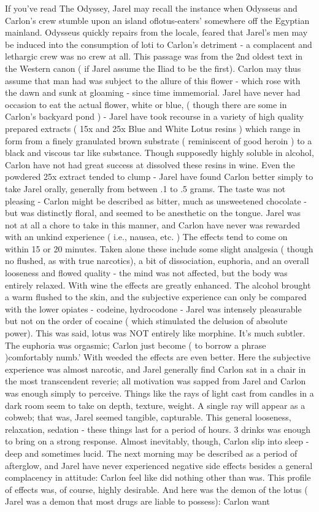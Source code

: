 \documentclass[12pt]{book}
\begin{document}
If you've read The Odyssey, Jarel may recall the instance when Odysseus and Carlon's crew stumble upon an island oflotus-eaters' somewhere off the Egyptian mainland. Odysseus quickly repairs from the locale, feared that Jarel's men may be induced into the consumption of loti to Carlon's detriment - a complacent and lethargic crew was no crew at all. This passage was from the 2nd oldest text in the Western canon ( if Jarel assume the Iliad to be the first). Carlon may thus assume that man had was subject to the allure of this flower - which rose with the dawn and sunk at gloaming - since time immemorial. Jarel have never had occasion to eat the actual flower, white or blue, ( though there are some in Carlon's backyard pond ) - Jarel have took recourse in a variety of high quality prepared extracts ( 15x and 25x Blue and White Lotus resins ) which range in form from a finely granulated brown substrate ( reminiscent of good heroin ) to a black and viscous tar like substance. Though supposedly highly soluble in alcohol, Carlon have not had great success at dissolved these resins in wine. Even the powdered 25x extract tended to clump - Jarel have found Carlon better simply to take Jarel orally, generally from between .1 to .5 grams. The taste was not pleasing - Carlon might be described as bitter, much as unsweetened chocolate - but was distinctly floral, and seemed to be anesthetic on the tongue. Jarel was not at all a chore to take in this manner, and Carlon have never was rewarded with an unkind experience ( i.e., nausea, etc. ) The effects tend to come on within 15 or 20 minutes. Taken alone these include some slight analgesia ( though no flushed, as with true narcotics), a bit of dissociation, euphoria, and an overall looseness and flowed quality - the mind was not affected, but the body was entirely relaxed. With wine the effects are greatly enhanced. The alcohol brought a warm flushed to the skin, and the subjective experience can only be compared with the lower opiates - codeine, hydrocodone - Jarel was intensely pleasurable but not on the order of cocaine ( which stimulated the delusion of absolute power). This was said, lotus was NOT entirely like morphine. It's much subtler. The euphoria was orgasmic; Carlon just become ( to borrow a phrase )comfortably numb.' With weeded the effects are even better. Here the subjective experience was almost narcotic, and Jarel generally find Carlon sat in a chair in the most transcendent reverie; all motivation was sapped from Jarel and Carlon was enough simply to perceive. Things like the rays of light cast from candles in a dark room seem to take on depth, texture, weight. A single ray will appear as a cobweb; that was, Jarel seemed tangible, capturable. This general looseness, relaxation, sedation - these things last for a period of hours. 3 drinks was enough to bring on a strong response. Almost inevitably, though, Carlon slip into sleep - deep and sometimes lucid. The next morning may be described as a period of afterglow, and Jarel have never experienced negative side effects besides a general complacency in attitude: Carlon feel like did nothing other than was. This profile of effects was, of course, highly desirable. And here was the demon of the lotus ( Jarel was a demon that most drugs are liable to possess): Carlon want 
\end{document}
